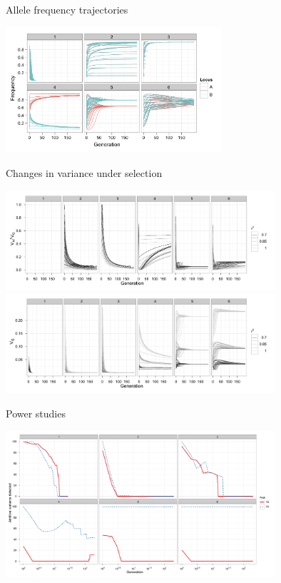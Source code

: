 \documentclass{beamer}
\begin{document}
\begin{frame}{Allele frequency trajectories}
	\begin{center}
		\includegraphics[width=8cm]{allelefreq_det.png}
	\end{center}
\end{frame}

\begin{frame}{Changes in variance under selection}
	\begin{center}
		\includegraphics[width=10cm]{propadditive_det_grey.pdf} \\
		\includegraphics[width=10cm]{Vg_det_grey.pdf}
	\end{center}
\end{frame}

\begin{frame}{Power studies}
	\begin{center}
		\includegraphics[width=10cm]{powersimple.pdf} \\
	\end{center}
\end{frame}
\end{document}
